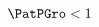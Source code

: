   \begin{equation}\begin{gathered}\begin{aligned}
    \PatPGro &  < 1   \label{eq:GICRaw}
  \end{aligned}\end{gathered}\end{equation}
